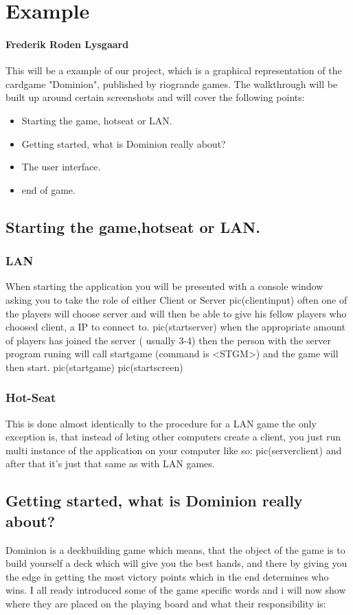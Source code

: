\section{Example}
\paragraph{Frederik Roden Lysgaard}
This will be a example of our project, which is a graphical representation of the cardgame "Dominion", published by riogrande games.
The walkthrough will be built up around certain screenshots and will cover the following points:

\begin{itemize}
\item Starting the game, hotseat or LAN.
\item Getting started, what is Dominion really about?
\item The user interface.
\item end of game.
\end{itemize}

\subsection{Starting the game,hotseat or LAN.}
\subsubsection{LAN}
When starting the application you will be presented with a console window asking you to take the role of either Client or Server
pic(clientinput)
often one of the players will choose server and will then be able to give his fellow players who choosed client, a IP to connect to.
pic(startserver)
when the appropriate amount of players has joined the server ( usually 3-4) then the person with the server program runing will
call startgame (command is \textless STGM\textgreater ) and the game will then start.
pic(startgame)
pic(startscreen)

\subsubsection{Hot-Seat}
This is done almost identically to the procedure for a LAN game the only exception is, that instead of leting other computers create a client, you just run multi instance of the application on your computer like so:
pic(serverclient)
and after that it's just that same as with LAN games.


\subsection{Getting started, what is Dominion really about?}
Dominion is a deckbuilding game which means, that the object of the game is to build yourself a deck which will give you the best hands, and there by giving you the edge in getting the most victory points which in the end determines who wins.
I all ready introduced some of the game specific words and i will now show where they are placed on the playing board and what their responsibility is:
